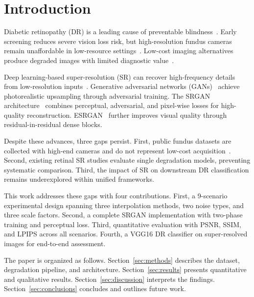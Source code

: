 \section{Introduction}

Diabetic retinopathy (DR) is a leading cause of preventable blindness~\cite{gulshan2016}.
Early screening reduces severe vision loss risk, but high-resolution fundus cameras remain unaffordable in low-resource settings~\cite{haque2017}.
Low-cost imaging alternatives produce degraded images with limited diagnostic value~\cite{willemink2020}.

Deep learning-based super-resolution (SR) can recover high-frequency details from low-resolution inputs~\cite{zhang2020}.
Generative adversarial networks (GANs)~\cite{goodfellow2014} achieve photorealistic upsampling through adversarial training.
The SRGAN architecture~\cite{ledig2017} combines perceptual, adversarial, and pixel-wise losses for high-quality reconstruction.
ESRGAN~\cite{wang2018} further improves visual quality through residual-in-residual dense blocks.

Despite these advances, three gaps persist.
First, public fundus datasets are collected with high-end cameras and do not represent low-cost acquisition~\cite{willemink2020}.
Second, existing retinal SR studies evaluate single degradation models, preventing systematic comparison.
Third, the impact of SR on downstream DR classification remains underexplored within unified frameworks.

This work addresses these gaps with four contributions.
First, a 9-scenario experimental design spanning three interpolation methods, two noise types, and three scale factors.
Second, a complete SRGAN implementation with two-phase training and perceptual loss.
Third, quantitative evaluation with PSNR, SSIM, and LPIPS across all scenarios.
Fourth, a VGG16 DR classifier on super-resolved images for end-to-end assessment.

The paper is organized as follows.
Section~\ref{sec:methods} describes the dataset, degradation pipeline, and architecture.
Section~\ref{sec:results} presents quantitative and qualitative results.
Section~\ref{sec:discussion} interprets the findings.
Section~\ref{sec:conclusions} concludes and outlines future work.
